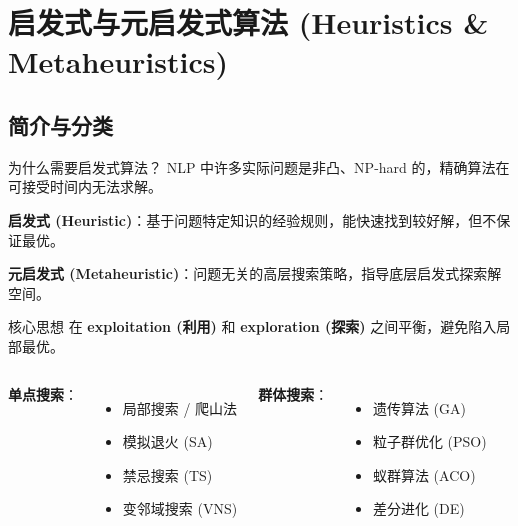 \documentclass[11pt, aspectratio=169, svgnames, table, fontset=fandol]{ctexbeamer}
\begin{document}

\section{启发式与元启发式算法 (Heuristics \& Metaheuristics)}

\subsection{简介与分类}

\begin{frame}{为什么需要启发式算法？}
  NLP 中许多实际问题是非凸、NP-hard 的，精确算法在可接受时间内无法求解。

  \vspace{6pt}
  \textbf{启发式 (Heuristic)}：基于问题特定知识的经验规则，能快速找到较好解，但不保证最优。

  \vspace{4pt}
  \textbf{元启发式 (Metaheuristic)}：问题无关的高层搜索策略，指导底层启发式探索解空间。

  \vspace{6pt}
  \begin{block}{核心思想}
    在 \textbf{exploitation (利用)} 和 \textbf{exploration (探索)} 之间平衡，避免陷入局部最优。
  \end{block}

  \begin{columns}[T]
    \textbf{单点搜索}：
    \begin{itemize}
      \item 局部搜索 / 爬山法
      \item 模拟退火 (SA)
      \item 禁忌搜索 (TS)
      \item 变邻域搜索 (VNS)
    \end{itemize}
    \textbf{群体搜索}：
    \begin{itemize}
      \item 遗传算法 (GA)
      \item 粒子群优化 (PSO)
      \item 蚁群算法 (ACO)
      \item 差分进化 (DE)
    \end{itemize}
  \end{columns}
\end{frame}
\end{document}

